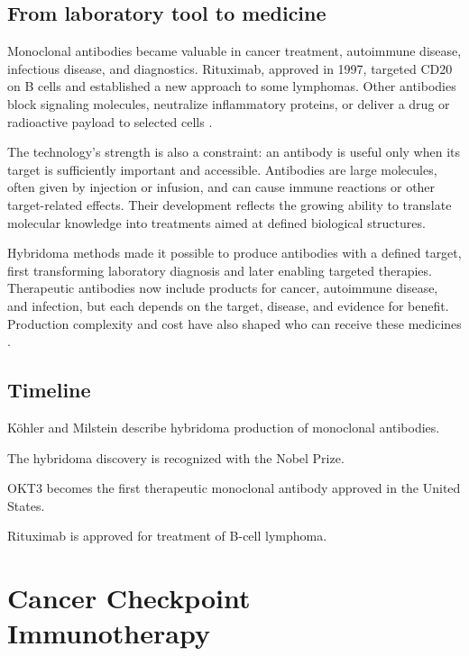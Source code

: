 \documentclass[12pt,oneside]{book}
\begin{document}
\section{From laboratory tool to medicine}
Monoclonal antibodies became valuable in cancer treatment, autoimmune disease, infectious disease, and diagnostics. Rituximab, approved in 1997, targeted CD20 on B cells and established a new approach to some lymphomas. Other antibodies block signaling molecules, neutralize inflammatory proteins, or deliver a drug or radioactive payload to selected cells \cite{nciRituximab}.

The technology's strength is also a constraint: an antibody is useful only
when its target is sufficiently important and accessible. Antibodies are large
molecules, often given by injection or infusion, and can cause immune
reactions or other target-related effects. Their development reflects the
growing ability to translate molecular knowledge into treatments aimed at
defined biological structures.

Hybridoma methods made it possible to produce antibodies with a defined
target, first transforming laboratory diagnosis and later enabling targeted
therapies. Therapeutic antibodies now include products for cancer, autoimmune
disease, and infection, but each depends on the target, disease, and evidence
for benefit. Production complexity and cost have also shaped who can receive
these medicines \cite{monoclonalHistory,nciRituximab}.

\section*{Timeline}
\begin{description}[leftmargin=2.3cm,style=nextline]
  \item[1975] Köhler and Milstein describe hybridoma production of monoclonal antibodies.
  \item[1984] The hybridoma discovery is recognized with the Nobel Prize.
  \item[1986] OKT3 becomes the first therapeutic monoclonal antibody approved in the United States.
  \item[1997] Rituximab is approved for treatment of B-cell lymphoma.
\end{description}
\chapter[Cancer Checkpoint Immunotherapy]{Cancer Checkpoint Immunotherapy}
\end{document}
